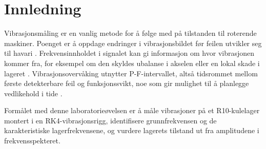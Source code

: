 \section{Innledning}
Vibrasjonsmåling er en vanlig metode for å følge med på tilstanden til roterende maskiner. Poenget er å oppdage endringer i vibrasjonsbildet før feilen utvikler seg til havari \parencite{vibrasjon1, tbv1}. Frekvensinnholdet i signalet kan gi informasjon om hvor vibrasjonen kommer fra, for eksempel om den skyldes ubalanse i akselen eller en lokal skade i lageret \parencite{nsen13306}. Vibrasjonsovervåking utnytter P-F-intervallet, altså tidsrommet mellom første detekterbare feil og funksjonssvikt, noe som gir mulighet til å planlegge vedlikehold i tide \parencite{tbv2}.

Formålet med denne laboratorieøvelsen er å måle vibrasjoner på et R10-kulelager montert i en RK4-vibrasjonsrigg, identifisere grunnfrekvensen og de karakteristiske lagerfrekvensene, og vurdere lagerets tilstand ut fra amplitudene i frekvensspekteret.
